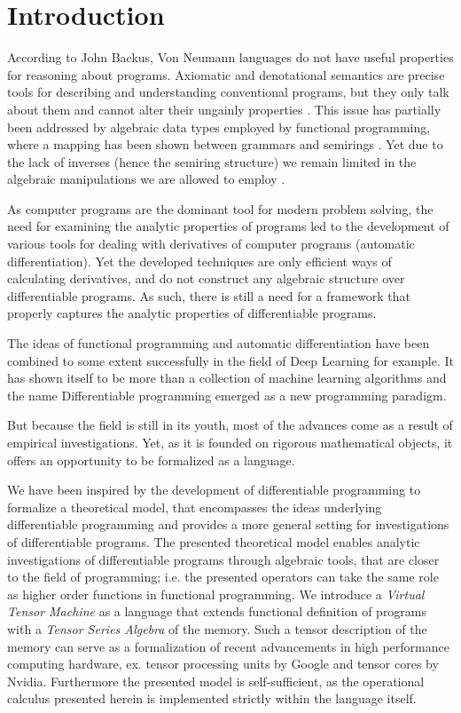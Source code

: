 \section{Introduction}

According to John Backus, Von Neumann languages do not have useful properties for reasoning about programs. Axiomatic and denotational semantics are precise tools for describing and understanding conventional programs, but they only talk about them and cannot alter their ungainly
properties \cite{backus}. This issue has partially been addressed by algebraic data types employed by functional programming, where a mapping has been shown between grammars and semirings \cite{7Trees}.
Yet due to the lack of inverses (hence the semiring structure) we remain limited in the algebraic manipulations we are allowed to employ \cite{complexCat}.

As computer programs are the dominant tool for modern problem solving, the need for examining the analytic properties of programs led to the development of various tools for dealing with derivatives of computer programs (automatic differentiation). Yet the developed techniques are only efficient ways of calculating derivatives, and do not construct any algebraic structure over differentiable programs. As such, there is still a need for a framework that properly captures the analytic properties of differentiable programs. 

The ideas of functional programming and automatic differentiation have been combined to some extent successfully in the field of Deep Learning for example. %
It has shown itself to be more than a collection of machine learning algorithms and the name Differentiable programming emerged as a new programming paradigm. 

But because the field is still in its youth, most of the advances come as a result of empirical investigations.%
Yet, as it is founded on rigorous mathematical objects, it offers an opportunity to be formalized as a language.

We have been inspired by the development of differentiable programming to formalize a theoretical model, that encompasses the ideas underlying differentiable programming and provides a more general setting for investigations of differentiable programs. The presented theoretical model enables analytic investigations of differentiable programs through algebraic tools, that are closer to the field of programming; i.e. the presented operators can take the same role as higher order functions in functional programming. We introduce a \emph{Virtual Tensor Machine} as a language that extends functional definition of programs with a \emph{Tensor Series Algebra} of the memory. Such a tensor description of the memory can serve as a formalization of recent advancements in high performance computing hardware, ex. tensor processing units by Google and tensor cores by Nvidia. Furthermore the presented model is self-sufficient, as the operational calculus presented herein is implemented strictly within the language itself.

